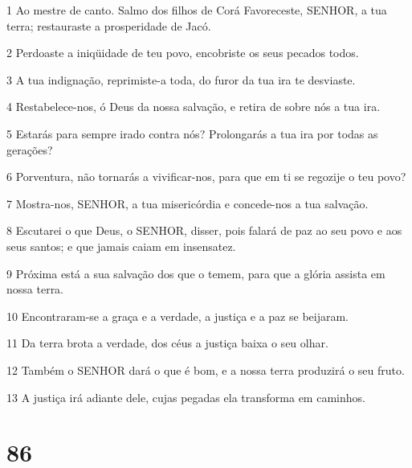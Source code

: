 \par 1 Ao mestre de canto. Salmo dos filhos de Corá Favoreceste, SENHOR, a tua terra; restauraste a prosperidade de Jacó.
\par 2 Perdoaste a iniqüidade de teu povo, encobriste os seus pecados todos.
\par 3 A tua indignação, reprimiste-a toda, do furor da tua ira te desviaste.
\par 4 Restabelece-nos, ó Deus da nossa salvação, e retira de sobre nós a tua ira.
\par 5 Estarás para sempre irado contra nós? Prolongarás a tua ira por todas as gerações?
\par 6 Porventura, não tornarás a vivificar-nos, para que em ti se regozije o teu povo?
\par 7 Mostra-nos, SENHOR, a tua misericórdia e concede-nos a tua salvação.
\par 8 Escutarei o que Deus, o SENHOR, disser, pois falará de paz ao seu povo e aos seus santos; e que jamais caiam em insensatez.
\par 9 Próxima está a sua salvação dos que o temem, para que a glória assista em nossa terra.
\par 10 Encontraram-se a graça e a verdade, a justiça e a paz se beijaram.
\par 11 Da terra brota a verdade, dos céus a justiça baixa o seu olhar.
\par 12 Também o SENHOR dará o que é bom, e a nossa terra produzirá o seu fruto.
\par 13 A justiça irá adiante dele, cujas pegadas ela transforma em caminhos.

\chapter{86}


